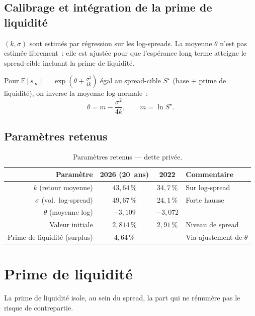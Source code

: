 \documentclass[11pt,a4paper]{article}
\newcommand{\tablehead}[1]{{\sffamily\bfseries\color{nxnavy}#1}}
\begin{document}
\subsection{Calibrage et intégration de la prime de liquidité}
$(k,\sigma)$ sont estimés par régression sur les log-spreads. La moyenne $\theta$ n'est pas estimée librement~: elle est ajustée pour que l'espérance long terme atteigne le spread-cible incluant la prime de liquidité.
\begin{definitionbox}
Pour $\mathbb E[s_\infty]=\exp(\theta+\tfrac{\sigma^2}{4k})$ égal au spread-cible $S^\star$ (base + prime de liquidité), on inverse la moyenne log-normale~:
\[
\theta=m-\frac{\sigma^2}{4k},\qquad m=\ln S^\star .
\]
\end{definitionbox}

\subsection{Paramètres retenus}
\begin{table}[H]
\centering\small
\renewcommand{\arraystretch}{1.4}\setlength{\tabcolsep}{6pt}
\begin{tabularx}{\linewidth}{R c c >{\raggedright\arraybackslash}p{3.2cm}}
\toprule
\tablehead{Paramètre} & \tablehead{2026 (20~ans)} & \tablehead{2022} & \tablehead{Commentaire} \\
\midrule
{} $k$ (retour moyenne) & $43{,}64\,\%$ & $34{,}7\,\%$ & Sur log-spread \\
$\sigma$ (vol.\ log-spread) & $49{,}67\,\%$ & $24{,}1\,\%$ & Forte hausse \\
 $\theta$ (moyenne log) & $-3{,}109$ & $-3{,}072$ & \\
Valeur initiale & $2{,}814\,\%$ & $2{,}91\,\%$ & Niveau de spread \\
 Prime de liquidité (surplus) & $4{,}64\,\%$ & --- & Via ajustement de $\theta$ \\
\bottomrule
\end{tabularx}
\caption{Paramètres retenus --- dette privée.}
\end{table}

\clearpage
\section{Prime de liquidité}
\label{sec:liqui}
La prime de liquidité isole, au sein du spread, la part qui ne rémunère pas le risque de contrepartie.
\end{document}
